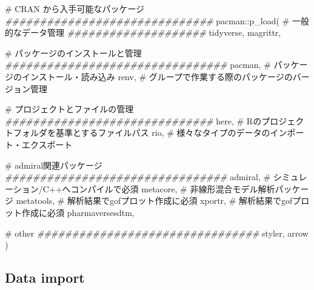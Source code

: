 \documentclass[
  letterpaper,
  DIV=11,
  numbers=noendperiod]{scrreprt}
\newenvironment{Shaded}{\begin{snugshade}}{\end{snugshade}}
\newcommand{\CommentTok}[1]{\textcolor[rgb]{0.37,0.37,0.37}{#1}}
\newcommand{\DocumentationTok}[1]{\textcolor[rgb]{0.37,0.37,0.37}{\textit{#1}}}
\newcommand{\FunctionTok}[1]{\textcolor[rgb]{0.28,0.35,0.67}{#1}}
\newcommand{\NormalTok}[1]{\textcolor[rgb]{0.00,0.23,0.31}{#1}}
\newcommand{\SpecialCharTok}[1]{\textcolor[rgb]{0.37,0.37,0.37}{#1}}
\begin{document}
\begin{Shaded}
\begin{Highlighting}[]
\CommentTok{\# CRAN から入手可能なパッケージ}
\DocumentationTok{\#\#\#\#\#\#\#\#\#\#\#\#\#\#\#\#\#\#\#\#\#\#\#\#\#\#\#\#\#\#}
\NormalTok{pacman}\SpecialCharTok{::}\FunctionTok{p\_load}\NormalTok{(}
  \CommentTok{\# 一般的なデータ管理}
  \DocumentationTok{\#\#\#\#\#\#\#\#\#\#\#\#\#\#\#\#\#\#\#\#}
\NormalTok{  tidyverse, }
\NormalTok{  magrittr, }
  
  \CommentTok{\# パッケージのインストールと管理}
  \DocumentationTok{\#\#\#\#\#\#\#\#\#\#\#\#\#\#\#\#\#\#\#\#\#\#\#\#\#\#\#\#\#\#\#\#}
\NormalTok{  pacman,   }\CommentTok{\# パッケージのインストール・読み込み}
\NormalTok{  renv,     }\CommentTok{\# グループで作業する際のパッケージのバージョン管理  }
  
  \CommentTok{\# プロジェクトとファイルの管理}
  \DocumentationTok{\#\#\#\#\#\#\#\#\#\#\#\#\#\#\#\#\#\#\#\#\#\#\#\#\#\#\#\#\#\#}
\NormalTok{  here,     }\CommentTok{\# Rのプロジェクトフォルダを基準とするファイルパス}
\NormalTok{  rio,      }\CommentTok{\# 様々なタイプのデータのインポート・エクスポート}
  
  \CommentTok{\# admiral関連パッケージ}
  \DocumentationTok{\#\#\#\#\#\#\#\#\#\#\#\#\#\#\#\#\#\#\#\#\#\#\#\#\#\#\#\#\#\#\#\#}
\NormalTok{  admiral, }\CommentTok{\# シミュレーション/C++へコンパイルで必須}
\NormalTok{  metacore,   }\CommentTok{\# 非線形混合モデル解析パッケージ}
\NormalTok{  metatools,     }\CommentTok{\# 解析結果でgofプロット作成に必須}
\NormalTok{  xportr, }\CommentTok{\# 解析結果でgofプロット作成に必須}
\NormalTok{  pharmaversesdtm,}
  
  \CommentTok{\# other}
  \DocumentationTok{\#\#\#\#\#\#\#\#\#\#\#\#\#\#\#\#\#\#\#\#\#\#\#\#\#\#\#\#\#\#\#\#}
\NormalTok{  styler,}
\NormalTok{  arrow}
\NormalTok{)}
\end{Highlighting}
\end{Shaded}

\hypertarget{data-import}{%
\subsection{Data import}\label{data-import}}
\end{document}
